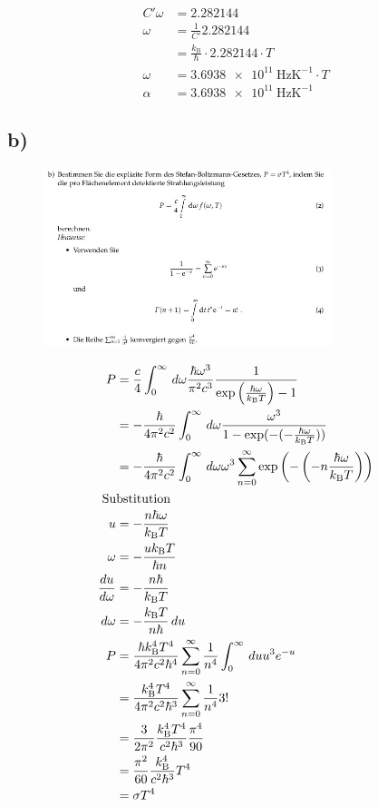 \begin{align*}
    C' \omega &= 2.282144\\
    \omega &= \frac{1}{C'} 2.282144\\
     &= \frac{k_{\text{B}}}{\hbar}\cdot 2.282144\cdot T\\
    \omega &= \SI{3,6938e11}{\hertz\kelvin\tothe{-1}}\cdot T\\
    \alpha &= \SI{3,6938e11}{\hertz\kelvin\tothe{-1}}
\end{align*}

\subsection{b)}

\begin{figure}[H]
    \centering
    \includegraphics[width=0.75\textwidth]{images/Aufgabe_1b.jpg}
    \label{fig:3}
\end{figure}

\begin{align}
    P &= \frac{c}{4} \int_0^{\infty} \, d \omega \frac{\hbar \omega ^3}{\pi ^2c^3} \frac{1}{\exp\left(\frac{\hbar \omega}{k_{\text{B}}T}\right)-1}\\
    &= \--\frac{\hbar}{4 \pi ^2 c^2} \int_0^ {\infty} \, d \omega \frac{\omega ^3}{1-\exp (\--(\--\frac{\hbar \omega}{k_{\text{B}}T}))}\\
    &= \-- \frac{\hbar}{4\pi ^2 c^2} \int_0^ {\infty} \, d \omega \omega ^3 \sum_{n=0}^{\infty} \exp\left(\--\left(\--n\frac{\hbar \omega}{k_{\text{B}}T}\right)\right)\\
    \intertext{
        Substitution
    }
    u &= \--\frac{n \hbar \omega}{k_{\text{B}}T}\\
    \omega &= \--\frac{u k_{\text{B}}T}{\hbar n}\\
    \frac{du}{d \omega}&= \--\frac{n \hbar}{k_{\text{B}}T}\\
    d \omega &= \--\frac{k_{\text{B}}T}{n \hbar} \,d u\\
    P&= \frac{\hbar k_{\text{B}}^4 T^4}{4 \pi ^2 c^2 \hbar ^4} \sum_{n=0}^ {\infty} \frac{1}{n^4}\int_0^{\infty} \, du u^3 e^ {-u}\\
    &= \frac{ k_{\text{B}}^4 T^4}{4 \pi ^2 c^2 \hbar ^3} \sum_{n=0}^ {\infty} \frac{1}{n^4} 3!\\
    &= \frac{3}{2 \pi ^2}\frac{ k_{\text{B}}^4 T^4}{ c^2 \hbar ^3} \frac{\pi ^4}{90}\\
    &= \frac{\pi ^2}{60} \frac{ k_{\text{B}}^4}{ c^2 \hbar ^3} T^4 \\
    &= \sigma T^4
\end{align}

